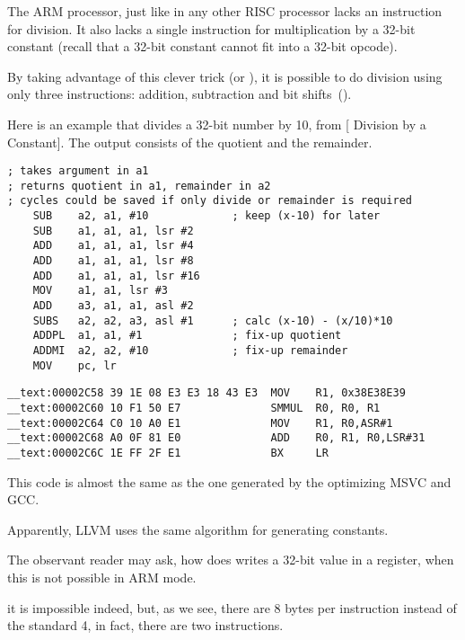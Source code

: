 ﻿

The ARM processor, just like in any other  RISC processor lacks an instruction for division.
It also lacks a single instruction for multiplication by a 32-bit constant (recall that a 32-bit
constant cannot fit into a 32-bit opcode).

By taking advantage of this clever trick (or ), it is possible to do division using only three instructions: addition,
subtraction and bit shifts~().

Here is an example that divides a 32-bit number by 10, from
[ Division by a Constant].
The output consists of the quotient and the remainder.

\begin{lstlisting}
; takes argument in a1
; returns quotient in a1, remainder in a2
; cycles could be saved if only divide or remainder is required
    SUB    a2, a1, #10             ; keep (x-10) for later
    SUB    a1, a1, a1, lsr #2
    ADD    a1, a1, a1, lsr #4
    ADD    a1, a1, a1, lsr #8
    ADD    a1, a1, a1, lsr #16
    MOV    a1, a1, lsr #3
    ADD    a3, a1, a1, asl #2
    SUBS   a2, a2, a3, asl #1      ; calc (x-10) - (x/10)*10
    ADDPL  a1, a1, #1              ; fix-up quotient
    ADDMI  a2, a2, #10             ; fix-up remainder
    MOV    pc, lr
\end{lstlisting}

\subsectionold{\OptimizingXcodeIV (\ARMMode)}

\begin{lstlisting}
__text:00002C58 39 1E 08 E3 E3 18 43 E3  MOV    R1, 0x38E38E39
__text:00002C60 10 F1 50 E7              SMMUL  R0, R0, R1
__text:00002C64 C0 10 A0 E1              MOV    R1, R0,ASR#1
__text:00002C68 A0 0F 81 E0              ADD    R0, R1, R0,LSR#31
__text:00002C6C 1E FF 2F E1              BX     LR
\end{lstlisting}

This code is almost the same as the one generated by the optimizing MSVC and GCC.

Apparently, LLVM uses the same algorithm for generating constants.


The observant reader may ask, how does \MOV writes a 32-bit value in a register, when this is not possible in ARM mode.

it is impossible indeed, but, as we see,
there are 8 bytes per instruction instead of the standard 4,
in fact, there are two instructions.

